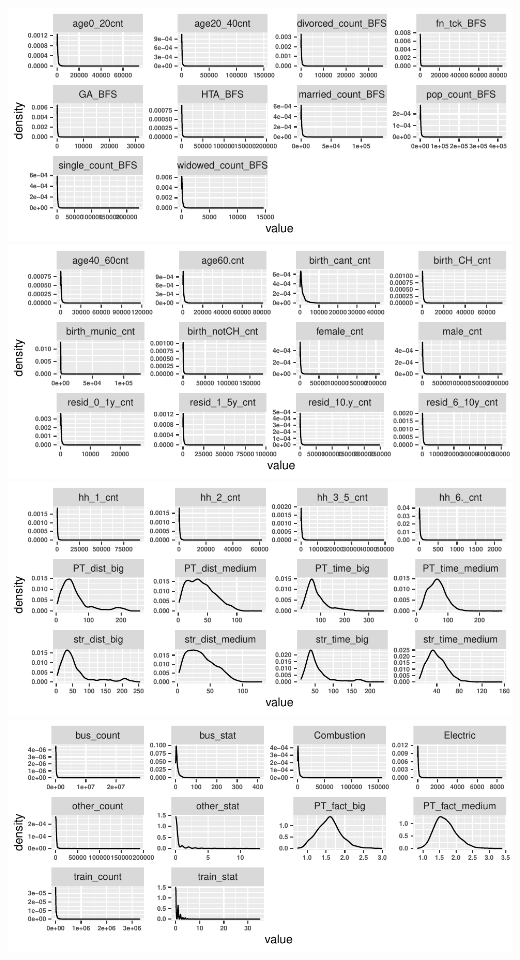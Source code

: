 \documentclass[
]{article}
\begin{document}
\includegraphics{Influence_factors_files/figure-latex/1.08_density_plots2-1.pdf}
\includegraphics{Influence_factors_files/figure-latex/1.08_density_plots2-2.pdf}
\includegraphics{Influence_factors_files/figure-latex/1.08_density_plots2-3.pdf}
\includegraphics{Influence_factors_files/figure-latex/1.08_density_plots2-4.pdf}
\end{document}
